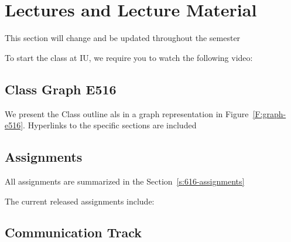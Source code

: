 \section{Lectures and Lecture Material}\label{S:lectures-516}

\begin{WARNING}
This section will change and be updated throughout the semester
\end{WARNING}


\begin{IU}

To start the class at IU, we require you to watch the following video:


\end{IU}

\subsection{Class Graph E516}
\label{s:graph-516}

We present the Class outline als in a graph representation in
Figure~\ref{F:graph-e516}. Hyperlinks to the specific sections are included





\subsection{Assignments}

All assignments are summarized in the Section~\ref{s:616-assignments}

The current released assignments include:



\subsection{Communication Track}


